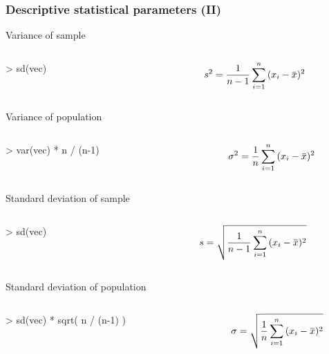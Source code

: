 \documentclass[ucs]{beamer}
\newcommand{\overbar}[1]{\mkern 1.5mu\overline{\mkern-1.5mu#1\mkern-1.5mu}\mkern 1.5mu}
\begin{document}
\begin{frame}
  \frametitle{Descriptive statistical parameters (II)}
\vspace*{-1.75ex}
\begin{block}{Variance of sample}
  \begin{columns}
    \begin{column}{0.55\textwidth}       
\small      \ttfamily > sd(vec)
    \end{column}
  
    \begin{column}{0.45\textwidth}
           \scriptsize
      \[  
s^2 = \frac{1}{n-1} \sum_{i=1}^{n}{(x_i - \overbar{x})^2 } 
      \] 
    \end{column}
  \end{columns}
\end{block}
\vspace*{-1.25ex}
\begin{block}{Variance of population}
  \begin{columns}
    \begin{column}{0.55\textwidth}       
\small      \ttfamily > var(vec) * n / (n-1)
    \end{column}
    \begin{column}{0.45\textwidth}
                            \scriptsize
      \[ 
      \sigma^2 = \frac{1}{n} \sum_{i=1}^{n}{(x_i - \overbar{x})^2 }
      \] 
    \end{column}
  \end{columns}
\end{block}
\vspace*{-1.25ex}
\begin{block}{Standard deviation of sample}
  \begin{columns}
    \begin{column}{0.55\textwidth}       
\small      \ttfamily > sd(vec)
    \end{column}
      \begin{column}{0.45\textwidth}
                 \scriptsize
      \[  
      s = \sqrt{\frac{1}{n-1} \sum_{i=1}^{n}{(x_i - \overbar{x})^2 } }
      \] 
    \end{column}
  \end{columns}
\end{block}
\vspace*{-1.25ex}
\begin{block}{Standard deviation of population}
  \begin{columns}
    \begin{column}{0.55\textwidth}             
     \small
      \ttfamily > sd(vec) * sqrt( n / (n-1) )
    \end{column}
    \begin{column}{0.45\textwidth}
                 \scriptsize
      \[ 
\sigma = \sqrt{\frac{1}{n} \sum_{i=1}^{n}{(x_i - \overbar{x})^2 } }
      \] 
    \end{column}
  \end{columns}
\end{block}
\end{frame}
\end{document}
